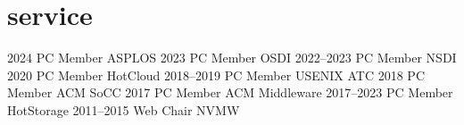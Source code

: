 \section{service}

\begin{entrylist}
    \eduentry
    {2024}
    {PC Member}
    {ASPLOS}
    \eduentry
    {2023}
    {PC Member}
    {OSDI}
    \eduentry
    {2022--2023}
    {PC Member}
    {NSDI}
    \eduentry
    {2020}
    {PC Member}
    {HotCloud}
    \eduentry
    {2018--2019}
    {PC Member}
    {USENIX ATC}
    \eduentry
    {2018}
    {PC Member}
    {ACM SoCC}
    \eduentry
    {2017}
    {PC Member}
    {ACM Middleware}
    \eduentry
    {2017--2023}
    {PC Member}
    {HotStorage}
    \eduentry
    {2011--2015}
    {Web Chair}
    {NVMW}
\end{entrylist}